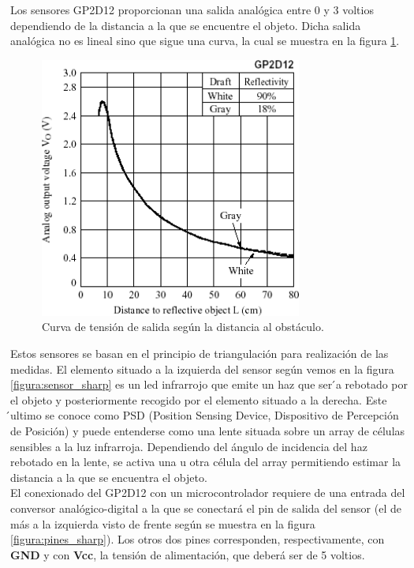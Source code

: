 Los sensores GP2D12 proporcionan una salida analógica entre 0 y 3 voltios dependiendo de la distancia a la que se encuentre el objeto. Dicha salida analógica no es
lineal sino que sigue una curva, la cual se muestra en la figura \ref{figura:curva_sharp}.

 \begin{figure}[H]
  \begin{center}
    \includegraphics[scale=1.4]{imagenes/curva_sharp.png}
  \end{center}
  \caption{Curva de tensión de salida según la distancia al obstáculo.}
  \label{figura:curva_sharp}
\end{figure}

Estos sensores se basan en el principio de triangulación para realización de las medidas. El elemento situado a la izquierda del sensor según vemos en la figura \ref{figura:sensor_sharp}
es un led infrarrojo que emite un haz que ser ́a rebotado por el objeto y posteriormente recogido por el elemento situado a la derecha. Este ́ultimo se conoce como PSD (Position 
Sensing Device, Dispositivo de Percepción de Posición)  y  puede  entenderse  como  una  lente situada sobre un array de células sensibles a la luz infrarroja. Dependiendo del 
ángulo de incidencia del haz rebotado en la lente, se activa una u otra célula del array permitiendo estimar la distancia a la que se encuentra el objeto.\\

El conexionado del GP2D12 con un microcontrolador requiere de una entrada del conversor analógico-digital a la que se conectará el pin de salida del sensor 
(el de más a la izquierda visto de frente según se muestra en la figura \ref{figura:pines_sharp}). Los otros dos pines corresponden, respectivamente, con \textbf{GND} y con
\textbf{Vcc}, la tensión de alimentación, que deberá ser de 5 voltios.\\

